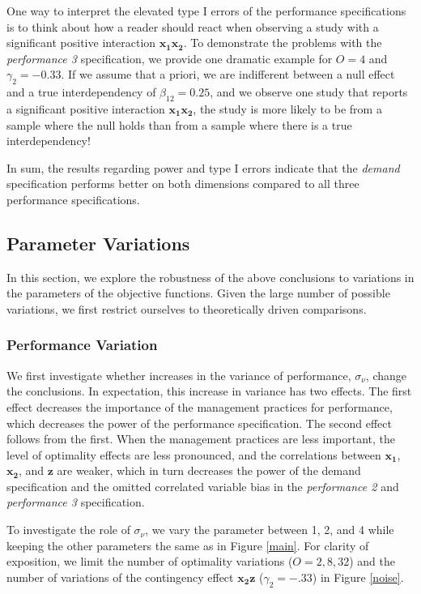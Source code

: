 \documentclass[12pt]{article}
\begin{document}
One way to interpret the elevated type I errors of the performance specifications is to think about how a reader should react when observing a study with a significant positive interaction \(\mathbf{x_1 x_2}\). To demonstrate the problems with the \emph{performance 3} specification, we provide one dramatic example for \(O = 4\) and \(\gamma_2 = -0.33\). If we assume that a priori, we are indifferent between a null effect and a true interdependency of \(\beta_{12} = 0.25\), and we observe one study that reports a significant positive interaction \(\mathbf{x_{1} x_{2}}\), the study is more likely to be from a sample where the null holds than from a sample where there is a true interdependency!

In sum, the results regarding power and type I errors indicate that the \emph{demand} specification performs better on both dimensions compared to all three performance specifications.

\subsection{Parameter Variations}\label{parameter-variations}

In this section, we explore the robustness of the above conclusions to variations in the parameters of the objective functions. Given the large number of possible variations, we first restrict ourselves to theoretically driven comparisons.

\subsubsection{Performance Variation}\label{performance-variation}

We first investigate whether increases in the variance of performance, $\sigma_{\nu}$, change the conclusions. In expectation, this increase in variance has two effects. The first effect decreases the importance of the management practices for performance, which decreases the power of the performance specification. The second effect follows from the first. When the management practices are less important, the level of optimality effects are less pronounced, and the correlations between $\mathbf{x_1}$, $\mathbf{x_2}$, and $\mathbf{z}$ are weaker, which in turn decreases the power of the demand specification and the omitted correlated variable bias in the \emph{performance 2} and \emph{performance 3} specification.

To investigate the role of $\sigma_{\nu}$, we vary the parameter between 1, 2, and 4 while keeping the other parameters the same as in Figure \ref{main}. For clarity of exposition, we limit the number of optimality variations ($O = 2, 8, 32$) and the number of variations of the contingency effect $\mathbf{x_2 z}$ ($\gamma_2 = -.33$) in Figure \ref{noise}.
\end{document}
